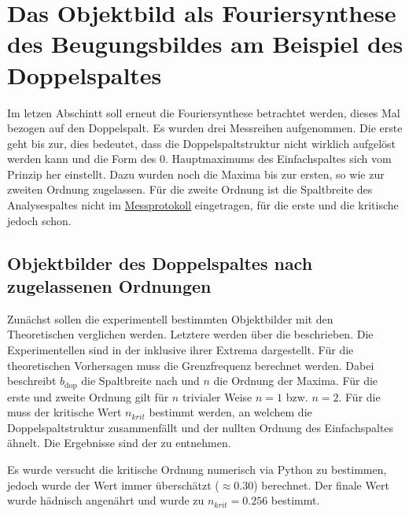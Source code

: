 \section{Das Objektbild als Fouriersynthese des Beugungsbildes
am Beispiel des Doppelspaltes}
\label{sec:A5}
Im letzen Abschintt soll erneut die Fouriersynthese betrachtet werden, dieses Mal bezogen auf den Doppelspalt. Es wurden drei Messreihen aufgenommen. 
Die erste geht bis zur, dies bedeutet, dass die Doppelspaltstruktur nicht wirklich aufgelöst werden kann und die Form des 0. Hauptmaximums des Einfachspaltes sich vom Prinzip her einstellt.
Dazu wurden noch die Maxima bis zur ersten, so wie zur zweiten Ordnung zugelassen. Für die zweite Ordnung ist die Spaltbreite des Analysespaltes nicht im \hyperref[ch:Protokoll]{Messprotokoll} eingetragen, für die erste und die kritische jedoch schon.

\subsection{Objektbilder des Doppelspaltes nach zugelassenen Ordnungen}
Zunächst sollen die experimentell bestimmten Objektbilder mit den Theoretischen verglichen werden. Letztere werden über die  beschrieben. Die Experimentellen sind in der  inklusive ihrer Extrema dargestellt. 
Für die theoretischen Vorhersagen muss die Grenzfrequenz
berechnet werden. Dabei beschreibt $b_\text{dop}$ die Spaltbreite nach  und $n$ die Ordnung der Maxima. Für die erste und zweite Ordnung gilt für $n$ trivialer Weise $n=1$ bzw. $n=2$. Für die muss der kritische Wert $n_{krit}$ bestimmt werden, an welchem die Doppelspaltstruktur zusammenfällt und der nullten Ordnung des Einfachspaltes ähnelt.
Die Ergebnisse sind der  zu entnehmen.

Es wurde versucht die kritische Ordnung numerisch via Python zu bestimmen, jedoch wurde der Wert immer überschätzt ($\approx 0.30$) berechnet. Der finale Wert wurde hädnisch angenährt und wurde zu $n_{krit} =0.256$ bestimmt. 


